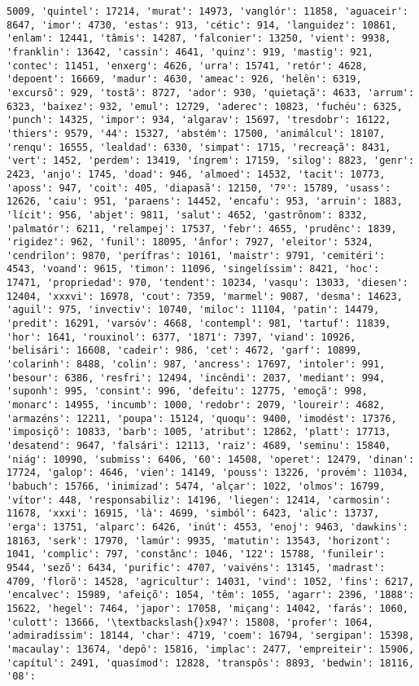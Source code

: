 \begin{Verbatim}[commandchars=\\\{\}]
5009, 'quintel': 17214, 'murat': 14973, 'vanglór': 11858, 'aguaceir': 8647, 'imor': 4730, 'estas': 913, 'cétic': 914, 'languidez': 10861, 'enlam': 12441, 'tâmis': 14287, 'falconier': 13250, 'vient': 9938, 'franklin': 13642, 'cassin': 4641, 'quinz': 919, 'mastig': 921, 'contec': 11451, 'enxerg': 4626, 'urra': 15741, 'retór': 4628, 'depoent': 16669, 'madur': 4630, 'ameac': 926, 'helên': 6319, 'excursõ': 929, 'tostã': 8727, 'ador': 930, 'quietaçã': 4633, 'arrum': 6323, 'baixez': 932, 'emul': 12729, 'aderec': 10823, 'fuchéu': 6325, 'punch': 14325, 'impor': 934, 'algarav': 15697, 'tresdobr': 16122, 'thiers': 9579, '44': 15327, 'abstém': 17500, 'animálcul': 18107, 'renqu': 16555, 'lealdad': 6330, 'simpat': 1715, 'recreaçã': 8431, 'vert': 1452, 'perdem': 13419, 'íngrem': 17159, 'silog': 8823, 'genr': 2423, 'anjo': 1745, 'doad': 946, 'almoed': 14532, 'tacit': 10773, 'aposs': 947, 'coit': 405, 'diapasã': 12150, '7º': 15789, 'usass': 12626, 'caiu': 951, 'paraens': 14452, 'encafu': 953, 'arruin': 1883, 'lícit': 956, 'abjet': 9811, 'salut': 4652, 'gastrônom': 8332, 'palmatór': 6211, 'relampej': 17537, 'febr': 4655, 'prudênc': 1839, 'rigidez': 962, 'funil': 18095, 'ânfor': 7927, 'eleitor': 5324, 'cendrilon': 9870, 'perífras': 10161, 'maistr': 9791, 'cemitéri': 4543, 'voand': 9615, 'timon': 11096, 'singelíssim': 8421, 'hoc': 17471, 'propriedad': 970, 'tendent': 10234, 'vasqu': 13033, 'diesen': 12404, 'xxxvi': 16978, 'cout': 7359, 'marmel': 9087, 'desma': 14623, 'aguil': 975, 'invectiv': 10740, 'miloc': 11104, 'patin': 14479, 'predit': 16291, 'varsóv': 4668, 'contempl': 981, 'tartuf': 11839, 'hor': 1641, 'rouxinol': 6377, '1871': 7397, 'viand': 10926, 'belisári': 16608, 'cadeir': 986, 'cet': 4672, 'garf': 10899, 'colarinh': 8488, 'colin': 987, 'ancress': 17697, 'intoler': 991, 'besour': 6386, 'resfri': 12494, 'incêndi': 2037, 'mediant': 994, 'suponh': 995, 'consint': 996, 'defeitu': 12775, 'emoçã': 998, 'monarc': 14955, 'incumb': 1000, 'redobr': 2079, 'loureir': 4682, 'armazéns': 12211, 'poupa': 15124, 'quoqu': 9400, 'imodést': 17376, 'imposiçõ': 10833, 'barb': 1005, 'atribut': 12862, 'platt': 17713, 'desatend': 9647, 'falsári': 12113, 'raiz': 4689, 'seminu': 15840, 'niág': 10990, 'submiss': 6406, '60': 14508, 'operet': 12479, 'dinan': 17724, 'galop': 4646, 'vien': 14149, 'pouss': 13226, 'provém': 11034, 'babuch': 15766, 'inimizad': 5474, 'alçar': 1022, 'olmos': 16799, 'vítor': 448, 'responsabiliz': 14196, 'liegen': 12414, 'carmosin': 11678, 'xxxi': 16915, 'là': 4699, 'simból': 6423, 'alic': 13737, 'erga': 13751, 'alparc': 6426, 'inút': 4553, 'enoj': 9463, 'dawkins': 18163, 'serk': 17970, 'lamúr': 9935, 'matutin': 13543, 'horizont': 1041, 'complic': 797, 'constânc': 1046, '122': 15788, 'funileir': 9544, 'sezõ': 6434, 'purific': 4707, 'vaivéns': 13145, 'madrast': 4709, 'florõ': 14528, 'agricultur': 14031, 'vind': 1052, 'fins': 6217, 'encalvec': 15989, 'afeiçõ': 1054, 'têm': 1055, 'agarr': 2396, '1888': 15622, 'hegel': 7464, 'japor': 17058, 'miçang': 14042, 'farás': 1060, 'culott': 13666, '\textbackslash{}x94?': 15808, 'profer': 1064, 'admiradíssim': 18144, 'char': 4719, 'coem': 16794, 'sergipan': 15398, 'macaulay': 13674, 'depô': 15816, 'implac': 2477, 'empreiteir': 15906, 'capítul': 2491, 'quasímod': 12828, 'transpôs': 8893, 'bedwin': 18116, '08': 
\end{Verbatim}
